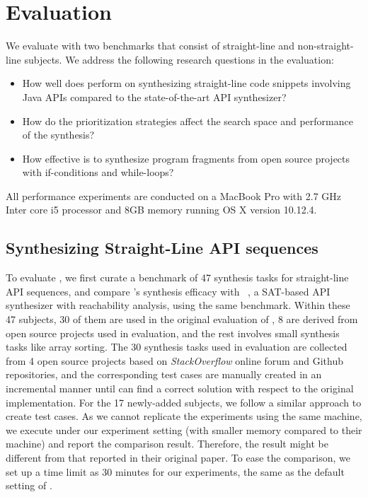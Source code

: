 \section{Evaluation}\label{sec:eval} 


We evaluate \tool with two benchmarks that consist of straight-line and non-straight-line subjects. We address the following research questions in the evaluation: 

\begin{itemize}
\item How well does \tool perform on synthesizing straight-line code snippets involving Java APIs compared to the state-of-the-art API synthesizer?
\item How do the  prioritization strategies affect the search space and performance of the synthesis?
\item How effective is \tool to synthesize program fragments from open source projects with if-conditions and while-loops?
\end{itemize}

All performance experiments are conducted on a MacBook Pro with 2.7 GHz Inter core i5 processor and 8GB memory running OS X version 10.12.4. %


\subsection{Synthesizing Straight-Line API sequences}
To evaluate \tool, we first curate a benchmark of 47 synthesis tasks for straight-line API sequences, and compare \tool's synthesis efficacy with \spt~\cite{isil:sypet17}, a SAT-based API synthesizer with reachability analysis,  using the same benchmark.  Within these 47 subjects, 30 of them are used in the original evaluation of \spt, 8 are derived from open source projects used in \spt evaluation, and the rest involves small synthesis tasks like array sorting. The 30 synthesis tasks used in \spt evaluation are collected from 4 open source projects based on {\it StackOverflow} online forum and Github repositories, and the corresponding test cases are manually created in an incremental manner until \spt can find a correct solution with respect to the original implementation. For the 17 newly-added subjects, we follow a similar approach to create test cases. As we cannot replicate the experiments using the same machine, we execute \spt under our experiment setting (with smaller memory compared to their machine) and report the comparison result. Therefore, the result might be different from that reported in their original paper. To ease the comparison, we set up a time limit as 30 minutes for our experiments, the same as the default setting of \spt. 







